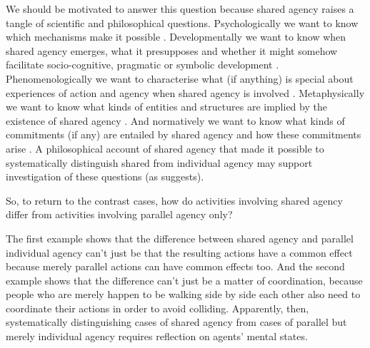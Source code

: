 \documentclass[12pt,\papersize]{extarticle}
\begin{document}
We should be motivated to answer this question because 
shared agency raises a tangle of scientific and philosophical questions.  Psychologically we want to know which mechanisms make it possible \citep{Sebanz:2006yq,vesper_minimal_2010}.  
Developmentally we want to know when shared agency emerges, what it presupposes and whether it might somehow facilitate socio-cognitive, pragmatic or symbolic development \citep{Moll:2007gu,Hughes:2004zj,Brownell:2006gu}.  
Phenomenologically we want to characterise what (if anything) is special about experiences of action and agency when shared agency is involved \citep{Pacherie:2010fk}.  
Metaphysically we want to know what kinds of entities and structures are implied by the existence of shared agency \citep{Gilbert:1992rs,Searle:1994lb}.  
And normatively we want to know what kinds of commitments (if any) are entailed by shared agency and how these commitments arise \citep{Roth:2004ki}.
A philosophical account of shared agency 
that made it possible to systematically distinguish shared from individual agency  
may support investigation of these questions (as \citealp{Bratman:2009lv} suggests).  

So, to return to the contrast cases,
how do activities involving shared agency differ from activities involving parallel agency only? 

The first example shows that the difference between shared agency and parallel individual agency can’t just be that the resulting actions have a common effect because merely parallel actions can have common effects too. 
And the second example shows that the difference can’t just be a matter of coordination, because people who are merely happen to be walking side by side each other also need to coordinate their actions in order to avoid colliding.  
Apparently, then, systematically distinguishing cases of shared agency from cases of parallel but merely individual agency  requires reflection on agents' mental states.


%
\end{document}
